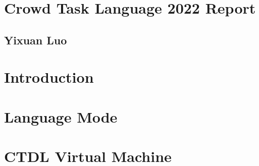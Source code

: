 \documentclass[12pt]{book}
\begin{document}
\frontmatter
%
\chapter*{\Huge \center Crowd Task Language 2022 Report}
\thispagestyle{empty}
\section*{\huge \center Yixuan Luo}
%
%
\tableofcontents
%
\mainmatter
%
\chapter{Introduction}
%
\chapter{Language Mode}
%
\chapter{CTDL Virtual Machine}

\appendix

\backmatter
\end{document}
